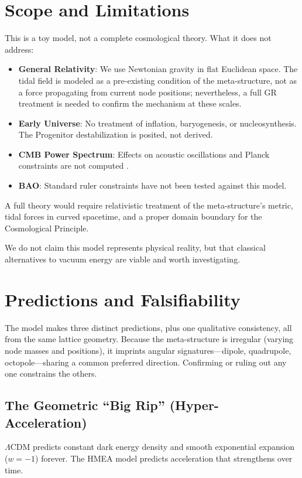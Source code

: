 \documentclass{article}
\begin{document}
\section{Scope and Limitations}
\label{sec:scope}
\label{sec:limitations}

This is a toy model, not a complete cosmological theory.
What it does not address:
\begin{itemize}
\item \textbf{General Relativity}: We use Newtonian gravity in flat Euclidean space. The tidal field is modeled as a pre-existing condition of the meta-structure, not as a force propagating from current node positions; nevertheless, a full GR treatment is needed to confirm the mechanism at these scales.
\item \textbf{Early Universe}: No treatment of inflation, baryogenesis, or nucleosynthesis. The Progenitor destabilization is posited, not derived.
\item \textbf{CMB Power Spectrum}: Effects on acoustic oscillations and Planck constraints are not computed \cite{Planck2020}.
\item \textbf{BAO}: Standard ruler constraints \cite{Eisenstein2005} have not been tested against this model.
\end{itemize}

\noindent A full theory would require relativistic treatment of the meta-structure's metric, tidal forces in curved spacetime, and a proper domain boundary for the Cosmological Principle.

We do not claim this model represents physical reality, but that classical alternatives to vacuum energy are viable and worth investigating.

\section{Predictions and Falsifiability}
\label{sec:predictions}
The model makes three distinct predictions, plus one qualitative consistency, all from the same lattice geometry.
Because the meta-structure is irregular (varying node masses and positions), it imprints angular signatures—dipole, quadrupole, octopole—sharing a common preferred direction.
Confirming or ruling out any one constrains the others.

\subsection{The Geometric ``Big Rip'' (Hyper-Acceleration)}
\label{sec:phantom}
$\Lambda$CDM predicts constant dark energy density and smooth exponential expansion ($w = -1$) forever.
The HMEA model predicts acceleration that strengthens over time.
\end{document}
